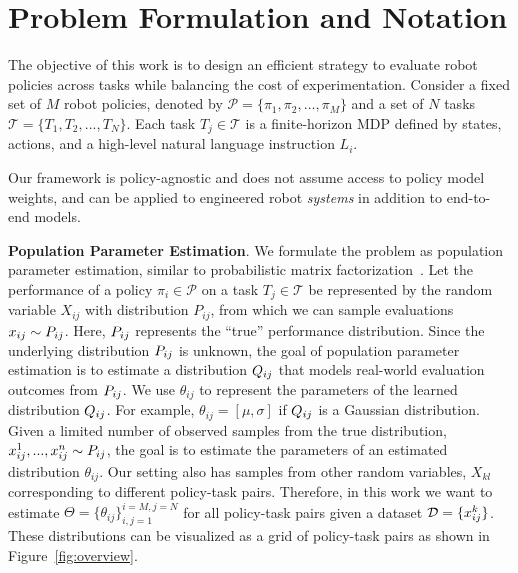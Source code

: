 \section{Problem Formulation and Notation}



The objective of this work is to design an efficient strategy to evaluate robot policies across tasks while balancing the cost of experimentation. 
Consider a fixed set of $M$ robot policies, denoted by $\mathcal{P} = \{\pi_1, \pi_2, \ldots, \pi_M\}$ and a set of $N$ tasks $\mathcal{T} = \{T_1, T_2, ..., T_N\}$. 
Each task $T_j \in \mathcal{T}$ is a finite-horizon MDP defined by states, actions, and a high-level natural language instruction $L_i$.

Our framework is policy-agnostic and does not assume access to policy model weights, and can be applied to engineered robot \textit{systems} in addition to end-to-end models.

\textbf{Population Parameter Estimation}. 
We formulate the problem as population parameter estimation, similar to probabilistic matrix factorization~\cite{mnih2007probabilistic}.
Let the performance of a policy ${\pi_i \in \mathcal{P}}$ on a task $T_j \in \mathcal{T}$ be represented by the random variable $X_{ij}$ with distribution $P_{ij}$, from which we can sample evaluations $x_{ij} \sim P_{ij}$. Here, $P_{ij}$ represents the ``true'' performance distribution.
Since the underlying distribution $P_{ij}$ is unknown, the goal of population parameter estimation is to estimate a distribution $Q_{ij}$ that models real-world evaluation outcomes from $P_{ij}$.
We use $\theta_{ij}$ to represent the parameters of the learned distribution $Q_{ij}$.
For example, $\theta_{ij}=[\mu, \sigma]$ if $Q_{ij}$ is a Gaussian distribution.
Given a limited number of observed samples from the true distribution, $x_{ij}^1, ..., x_{ij}^n \sim P_{ij}$, the goal is to estimate the parameters of an estimated distribution $\theta_{ij}$.
Our setting also has samples from other random variables, $X_{kl}$ corresponding to different policy-task pairs. 
Therefore, in this work we want to estimate $\Theta = \{\theta_{ij}\}_{i, j = 1}^{i=M, j = N}$ for all policy-task pairs given a dataset $\mathcal{D}=\{x_{ij}^k\}$.
These distributions can be visualized as a grid of policy-task pairs as shown in Figure~\ref{fig:overview}.

